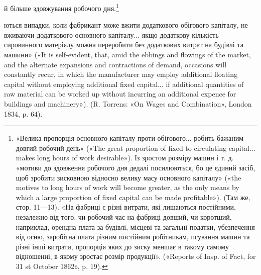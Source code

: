 й більше здовжування робочого дня.\footnote{
«Велика пропорція основного капіталу проти обігового... робить
бажаним довгий робочий день» («The great proportion of fixed to circulating
capital... makes long hours of work desirable»). Із зростом розміру
машин і т. д. «мотиви до здовження робочого дня дедалі посилюються,
бо це єдиний засіб, щоб зробити зисковною відносно велику масу основного
капіталу» («the motives to long hours of work will become greater,
as the only means by which a large proportion of fixed capital can be
made profitable»). (Там же, стор. 11—13). «На фабриці є різні витрати,
які лишаються постійними, незалежно від того, чи робочий час на
фабриці довший, чи коротший, наприклад, орендна плата за будівлі, місцеві
та загальні податки, убезпечення від огню, заробітна плата різним
постійним робітникам, псування машин та різні інші витрати, пропорція
яких до зиску меншає в такому самому відношенні, в якому
зростає розмір продукції». («Reports of Insp. of Fact, for 31 st October
1862», p. 19).
}

ються випадки, коли фабрикант може вжити додаткового обігового капіталу,
не вживаючи додаткового основного капіталу... якщо додаткову
кількість сировинного матеріялу можна переробити без додаткових витрат
на будівлі та машини» («It is self-evident, that, amid the ebbings and
flowings of the market, and the alternate expansions and contractions of
demand, occasions will constantly recur, in which the manufacturer may
employ additional floating capital without employing additional fixed
capital... if additional quantities of raw material can be worked up without
incurring an additional expence for buildings and machinery»).
(R. Torrens: «On Wages and Combination», London 1834, p. 64).
